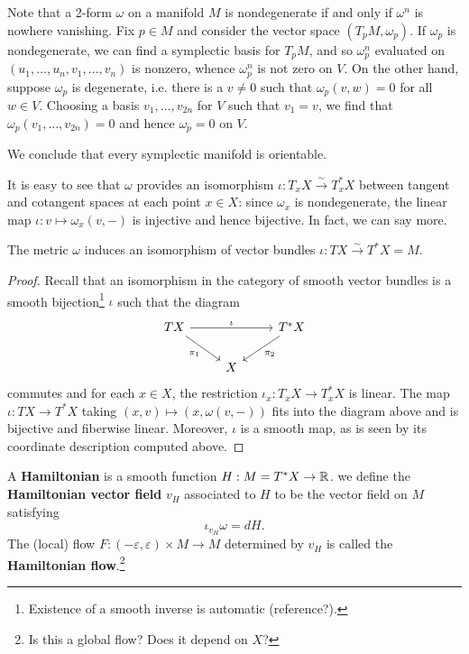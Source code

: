 \documentclass{amsart}
\begin{document}
\begin{remark}
    Note that a 2-form $\omega$ on a manifold $M$ is nondegenerate if and only if $\omega^n$ is
    nowhere vanishing. Fix $p\in M$ and consider the vector space $(T_pM, \omega_p)$. If
    $\omega_p$ is nondegenerate, we can find a symplectic basis for $T_pM$, and so $\omega_p^n$
    evaluated on $(u_1,\ldots,u_n,v_1,\ldots ,v_n)$ is nonzero, whence $\omega_p^n$ is not zero
    on $V$. On the other hand, suppose $\omega_p$ is degenerate, i.e. there is a $v\neq0$ such
    that $\omega_p(v,w)=0$ for all $w\in V$. Choosing a basis $v_1,\ldots,v_{2n}$ for $V$ such
    that $v_1=v$, we find that $\omega_p(v_1,\ldots,v_{2n})=0$ and hence $\omega_p=0$ on $V$.

    We conclude that every symplectic manifold is orientable.
    \label{rem:nondeg}
\end{remark}

It is easy to see that $\omega$ provides an isomorphism $\iota:T_xX\xrightarrow{\sim} T_x^*X$
between tangent and cotangent spaces at each point $x\in X$: since $\omega_x$ is nondegenerate, the linear
map $\iota:v\mapsto \omega_x(v,-)$ is injective and hence bijective. In fact, we can say more.

\begin{proposition}
    The metric $\omega$ induces an isomorphism of vector bundles $\iota:TX\xrightarrow{\sim}T^*X=M$.
\end{proposition}
\begin{proof}
    Recall that an isomorphism in the category of smooth vector bundles is a smooth
    bijection\footnote{Existence of a smooth inverse is automatic (reference?).}
    $\iota$ such that the diagram
    \begin{equation*}
        \begin{tikzcd}
            TX\ar{rr}{\iota}\ar[swap]{rd}{\pi_1} & & T^*X\ar{ld}{\pi_2}\\
            & X
        \end{tikzcd}
    \end{equation*}
    commutes and for each $x\in X$, the restriction $\iota_x:T_xX\to T^*_xX$ is linear.
    The map $\iota:TX\to T^*X$ taking $(x,v)\mapsto (x,\omega(v,-))$ fits into the diagram above
    and is bijective and fiberwise linear. Moreover, $\iota$ is a smooth map, as is seen by
    its coordinate description computed above.
\end{proof}

\begin{definition}
    A \textbf{Hamiltonian} is a smooth function $H:M=T^*X\to\mathbb{R}$.
    we define the \textbf{Hamiltonian vector field} $v_H$ associated to $H$ to be the vector
    field on $M$ satisfying
    \begin{equation*}
        \iota_{v_H}\omega = dH.
    \end{equation*}
    The (local) flow $F:(-\varepsilon,\varepsilon)\times M\to M$ determined by $v_H$ is
    called the \textbf{Hamiltonian flow}.\footnote{Is this a global flow? Does it depend on $X$?}
\end{definition}
\end{document}
